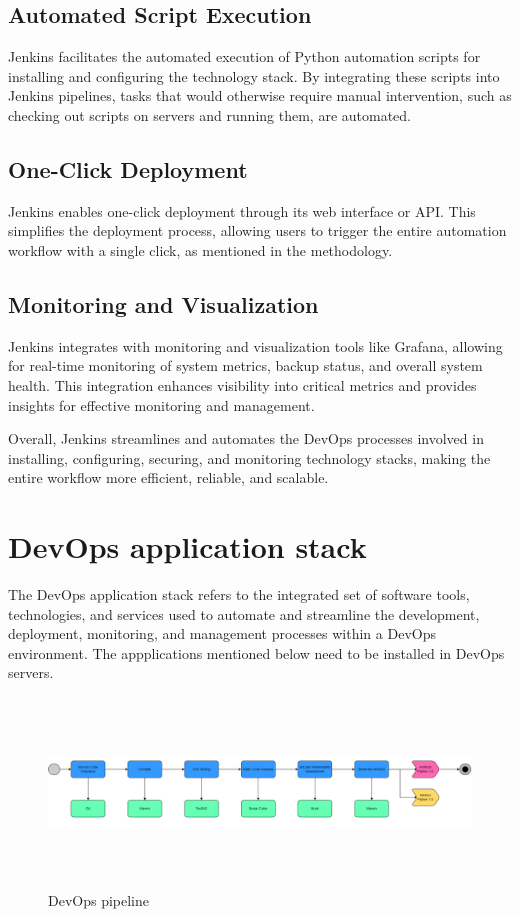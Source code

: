 \documentclass[12pt,a4paper,oneside]{report}
\begin{document}
\subsection{Automated Script Execution}
\hspace{1cm} Jenkins facilitates the automated execution of Python automation scripts for installing and configuring the technology stack. By integrating these scripts into Jenkins pipelines, tasks that would otherwise require manual intervention, such as checking out scripts on servers and running them, are automated.


\subsection{One-Click Deployment}
\hspace{1cm} Jenkins enables one-click deployment through its web interface or API. This simplifies the deployment process, allowing users to trigger the entire automation workflow with a single click, as mentioned in the methodology.

\subsection{Monitoring and Visualization}
\hspace{1cm} Jenkins integrates with monitoring and visualization tools like Grafana, allowing for real-time monitoring of system metrics, backup status, and overall system health. This integration enhances visibility into critical metrics and provides insights for effective monitoring and management.

Overall, Jenkins streamlines and automates the DevOps processes involved in installing, configuring, securing, and monitoring technology stacks, making the entire workflow more efficient, reliable, and scalable.



\section{DevOps application stack}
\par The DevOps application stack refers to the integrated set of software tools, technologies, and services used to automate and streamline the development, deployment, monitoring, and management processes within a DevOps environment. The appplications mentioned below need to be installed in DevOps servers.

\begin{figure}[ht]
    \centering
    \includegraphics[width=180mm , height = 50mm]{images/devops stack.png}
    \caption{DevOps pipeline}
    \label{fig:figure2_2}
\end{figure}
\end{document}

